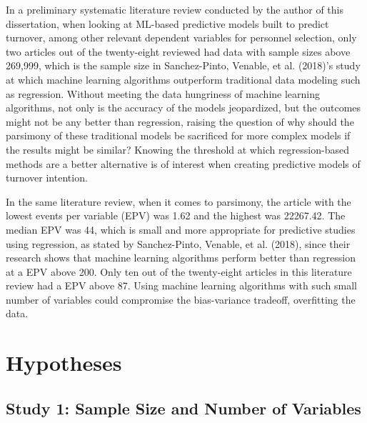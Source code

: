 \documentclass[
  man]{apa7}
\begin{document}
In a preliminary systematic literature review conducted by the author of this dissertation, when looking at ML-based predictive models built to predict turnover, among other relevant dependent variables for personnel selection, only two articles out of the twenty-eight reviewed had data with sample sizes above 269,999, which is the sample size in Sanchez-Pinto, Venable, et al. (2018)'s study at which machine learning algorithms outperform traditional data modeling such as regression.
Without meeting the data hungriness of machine learning algorithms, not only is the accuracy of the models jeopardized, but the outcomes might not be any better than regression, raising the question of why should the parsimony of these traditional models be sacrificed for more complex models if the results might be similar? Knowing the threshold at which regression-based methods are a better alternative is of interest when creating predictive models of turnover intention.

In the same literature review, when it comes to parsimony, the article with the lowest events per variable (EPV) was 1.62 and the highest was 22267.42.
The median EPV was 44, which is small and more appropriate for predictive studies using regression, as stated by Sanchez-Pinto, Venable, et al. (2018), since their research shows that machine learning algorithms perform better than regression at a EPV above 200.
Only ten out of the twenty-eight articles in this literature review had a EPV above 87.
Using machine learning algorithms with such small number of variables could compromise the bias-variance tradeoff, overfitting the data.

\hypertarget{hypotheses}{%
\section{Hypotheses}\label{hypotheses}}

\hypertarget{study-1-sample-size-and-number-of-variables}{%
\subsection{Study 1: Sample Size and Number of Variables}\label{study-1-sample-size-and-number-of-variables}}
\end{document}
